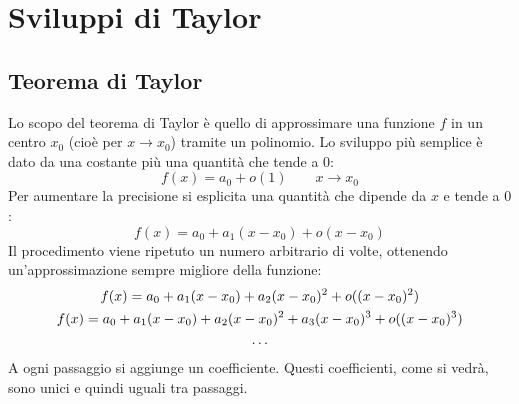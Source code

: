 \section{Sviluppi di Taylor}

\subsection{Teorema di Taylor}
Lo scopo del teorema di Taylor è quello di approssimare una funzione $f$ in un centro $x_0$ (cioè per $x\to x_0$) tramite un polinomio. Lo sviluppo più semplice è dato da una costante più una quantità che tende a $0$:
\begin{equation}
	\label{taylor0}
	f(x)=a_0+o(1)\qquad x\to x_0
\end{equation}
Per aumentare la precisione si esplicita una quantità che dipende da $x$ e tende a $0$:
\begin{equation}
	\label{taylor1}
	f(x)=a_0+a_1(x-x_0)+o(x-x_0)
\end{equation}
Il procedimento viene ripetuto un numero arbitrario di volte, ottenendo un'approssimazione sempre migliore della funzione:
\begin{gather}
	\label{taylor2}
	f(x)=a_0+a_1(x-x_0)+a_2(x-x_0)^2+o((x-x_0)^2)\\
	\label{taylor3}
	f(x)=a_0+a_1(x-x_0)+a_2(x-x_0)^2+a_3(x-x_0)^3+o((x-x_0)^3)\\
	\dots\notag
\end{gather}
A ogni passaggio si aggiunge un coefficiente. Questi coefficienti, come si vedrà, sono unici e quindi uguali tra passaggi.

